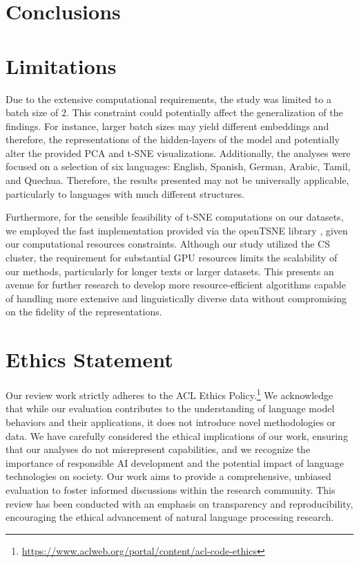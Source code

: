 \documentclass[11pt]{article}
\begin{document}
\section{Conclusions}


\section*{Limitations}
Due to the extensive computational requirements, the study was limited to a batch size of 2. This constraint could potentially affect the generalization of the findings. For instance, larger batch sizes may yield different embeddings and therefore, the representations of the hidden-layers of the model and potentially alter the provided PCA and t-SNE visualizations. Additionally, the analyses were focused on a selection of six languages: English, Spanish, German, Arabic, Tamil, and Quechua. Therefore, the results presented may not be universally applicable, particularly to languages with much different structures.

Furthermore, for the sensible feasibility of t-SNE computations on our datasets, we employed the fast implementation provided via the openTSNE library \cite{opentsne}, given our computational resources constraints. Although our study utilized the CS cluster, the requirement for substantial GPU resources limits the scalability of our methods, particularly for longer texts or larger datasets. This presents an avenue for further research to develop more resource-efficient algorithms capable of handling more extensive and linguistically diverse data without compromising on the fidelity of the representations.

\section*{Ethics Statement}
Our review work strictly adheres to the ACL Ethics Policy.\footnote{\url{https://www.aclweb.org/portal/content/acl-code-ethics}} We acknowledge that while our evaluation contributes to the understanding of language model behaviors and their applications, it does not introduce novel methodologies or data. We have carefully considered the ethical implications of our work, ensuring that our analyses do not misrepresent capabilities, and we recognize the importance of responsible AI development and the potential impact of language technologies on society. Our work aims to provide a comprehensive, unbiased evaluation to foster informed discussions within the research community. This review has been conducted with an emphasis on transparency and reproducibility, encouraging the ethical advancement of natural language processing research.
\end{document}
